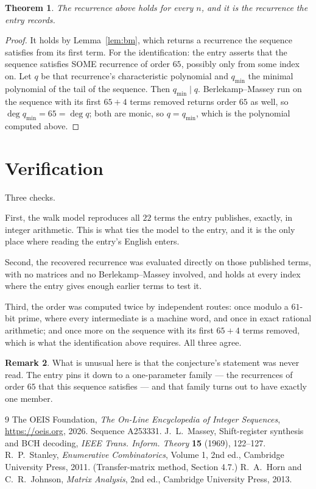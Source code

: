 \documentclass[11pt,a4paper]{article}
\theoremstyle{plain}
\newtheorem{theorem}{Theorem}
\theoremstyle{definition}
\newtheorem{remark}[theorem]{Remark}
\begin{document}
\begin{theorem}
The recurrence above holds for every $n$, and it is the recurrence the entry records.
\end{theorem}

\begin{proof}
It holds by Lemma~\ref{lem:bm}, which returns a recurrence the sequence satisfies from its
first term. For the identification: the entry asserts that the sequence satisfies SOME
recurrence of order $65$, possibly only from some index on. Let $q$ be that recurrence's
characteristic polynomial and $q_{\min}$ the minimal polynomial of the tail of the sequence.
Then $q_{\min}\mid q$. Berlekamp--Massey run on the sequence with its first $65+4$ terms
removed returns order $65$ as well, so $\deg q_{\min}=65=\deg q$; both are monic, so
$q=q_{\min}$, which is the polynomial computed above.
\end{proof}

\section{Verification}

Three checks.

First, the walk model reproduces all $22$ terms the entry publishes, exactly, in integer
arithmetic. This is what ties the model to the entry, and it is the only place where reading
the entry's English enters.

Second, the recovered recurrence was evaluated directly on those published terms, with no
matrices and no Berlekamp--Massey involved, and holds at every index where the entry gives
enough earlier terms to test it.

Third, the order was computed twice by independent routes: once modulo a $61$-bit prime, where
every intermediate is a machine word, and once in exact rational arithmetic; and once more on
the sequence with its first $65+4$ terms removed, which is what the identification above
requires. All three agree.

\begin{remark}
What is unusual here is that the conjecture's statement was never read. The entry pins it down
to a one-parameter family --- the recurrences of order $65$ that this sequence satisfies
--- and that family turns out to have exactly one member.
\end{remark}

\begin{thebibliography}{9}
 The OEIS Foundation, \emph{The On-Line Encyclopedia of Integer
Sequences}, \url{https://oeis.org}, 2026. Sequence A253331.
 J.~L.~Massey, Shift-register synthesis and BCH decoding, \emph{IEEE
Trans. Inform. Theory} \textbf{15} (1969), 122--127.
 R.~P.~Stanley, \emph{Enumerative Combinatorics}, Volume 1, 2nd ed.,
Cambridge University Press, 2011. (Transfer-matrix method, Section 4.7.)
 R.~A.~Horn and C.~R.~Johnson, \emph{Matrix Analysis}, 2nd ed., Cambridge
University Press, 2013.
\end{thebibliography}
\end{document}
